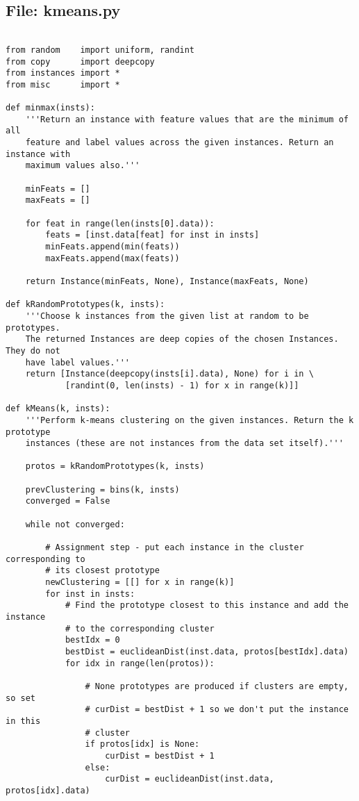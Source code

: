 \documentclass{article}
\begin{document}
\subsection*{File: kmeans.py}
\begin{verbatim}

from random    import uniform, randint
from copy      import deepcopy
from instances import *
from misc      import *

def minmax(insts):
    '''Return an instance with feature values that are the minimum of all
    feature and label values across the given instances. Return an instance with
    maximum values also.'''

    minFeats = []
    maxFeats = []

    for feat in range(len(insts[0].data)):
        feats = [inst.data[feat] for inst in insts]
        minFeats.append(min(feats))
        maxFeats.append(max(feats))

    return Instance(minFeats, None), Instance(maxFeats, None)

def kRandomPrototypes(k, insts):
    '''Choose k instances from the given list at random to be prototypes.
    The returned Instances are deep copies of the chosen Instances. They do not
    have label values.'''
    return [Instance(deepcopy(insts[i].data), None) for i in \
            [randint(0, len(insts) - 1) for x in range(k)]]

def kMeans(k, insts):
    '''Perform k-means clustering on the given instances. Return the k prototype
    instances (these are not instances from the data set itself).'''

    protos = kRandomPrototypes(k, insts)

    prevClustering = bins(k, insts)
    converged = False

    while not converged:

        # Assignment step - put each instance in the cluster corresponding to
        # its closest prototype
        newClustering = [[] for x in range(k)]
        for inst in insts:
            # Find the prototype closest to this instance and add the instance
            # to the corresponding cluster
            bestIdx = 0
            bestDist = euclideanDist(inst.data, protos[bestIdx].data)
            for idx in range(len(protos)):

                # None prototypes are produced if clusters are empty, so set
                # curDist = bestDist + 1 so we don't put the instance in this
                # cluster
                if protos[idx] is None:
                    curDist = bestDist + 1
                else:
                    curDist = euclideanDist(inst.data, protos[idx].data)


\end{verbatim}
\end{document}
